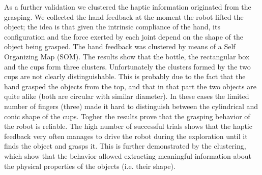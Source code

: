 As a further validation we clustered the haptic information originated from
the grasping. We collected the hand feedback at the moment the robot lifted the
object; the idea is that given the intrinsic compliance of the hand, its
configuration and the force exerted by each joint depend on the shape of the
object being grasped.
The hand feedback was clustered by means of a Self Organizing Map (SOM). The results
show that the bottle, the rectangular box and the cups form three clusters.
Unfortunately the clusters formed by the two cups are not clearly distinguishable.
This is probably due to the fact that the hand grasped the objects from the
top, and that in that part the two objects are quite alike (both are circular with
similar diameter). In these cases the limited number of fingers (three)
made it hard to distinguish between the cylindrical and conic shape of the cups.
Togher the results prove that the grasping behavior of
the robot is reliable. The high number of successful trials shows that the haptic
feedback very often manages to drive the robot during the exploration until it
finds the object and grasps it. This is further demonstrated by the clustering,
which show that the behavior allowed extracting meaningful information about the
physical properties of the objects (i.e. their shape).



